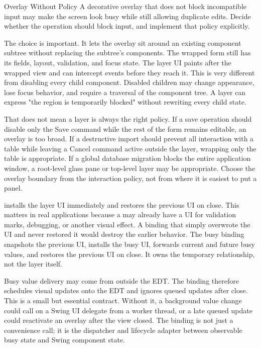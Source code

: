 \begin{pitfallbox}{Overlay Without Policy}
A decorative overlay that does not block incompatible input may make the screen
look busy while still allowing duplicate edits. Decide whether the operation
should block input, and implement that policy explicitly.
\end{pitfallbox}

The  choice is important. It lets the overlay sit around an
existing component subtree without replacing the subtree's components. The
wrapped form still has its fields, layout, validation, and focus state. The
layer UI paints after the wrapped view and can intercept events before they
reach it. This is very different from disabling every child component. Disabled
children may change appearance, lose focus behavior, and require a traversal of
the component tree. A layer can express "the region is temporarily blocked"
without rewriting every child state.

That does not mean a layer is always the right policy. If a save operation
should disable only the Save command while the rest of the form remains
editable, an overlay is too broad. If a destructive import should prevent all
interaction with a table while leaving a Cancel command active outside the
layer, wrapping only the table is appropriate. If a global database migration
blocks the entire application window, a root-level glass pane or top-level
layer may be appropriate. Choose the overlay boundary from the interaction
policy, not from where it is easiest to put a panel.

 installs the layer UI immediately and restores the
previous UI on close. This matters in real applications because a 
may already have a UI for validation marks, debugging, or another visual
effect. A binding that simply overwrote the UI and never restored it would
destroy the earlier behavior. The busy binding snapshots the previous UI,
installs the busy UI, forwards current and future busy values, and restores the
previous UI on close. It owns the temporary relationship, not the layer itself.

Busy value delivery may come from outside the EDT. The binding therefore
schedules visual updates onto the EDT and ignores queued updates after close.
This is a small but essential contract. Without it, a background value change
could call  on a Swing UI delegate from a worker thread, or a late
queued update could reactivate an overlay after the view closed. The binding is
not just a convenience call; it is the dispatcher and lifecycle adapter between
observable busy state and Swing component state.

